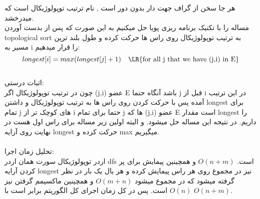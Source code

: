 \problem{}
هر جا سخن از گراف جهت دار بدون دور است , نام ترتیب توپولوژیکال است که میدرخشد.\\
مساله را با تکنیک برنامه ریزی پویا حل میکنیم به این صورت که 
پس از بدست آوردن topological sort 
به ترتیب توپولوژیکال روی راس ها حرکت کرده و طول بلند ترین مسیر به i را قرار میدهیم:\\
\[
    longest[i] = max(longest[j]+1)\quad \text{\LR{for all j that we have (j,i) in E}}
\]
\\
اثبات درستی:\\
 چون در ترتیب توپولوژیکال اگر  (j,i) عضو E
باشد آنگاه حتما j قبل از i در این ترتیب آمده
پس با حرکت کردن روی راس ها به ترتیب توپولوژیکال و داشتن longest  برای تمام j های 
کوچک تر از i حتما برای تمام j ها که (j,i) عضو E است
مقدار longest را داریم.
در نتیجه این مساله حل میشود.
و البته اولین زیر مساله برای راس اول هست 
در نهایت روی آرایه longest حرکت کرده و max میگیریم.\\\\
تحلیل زمان اجرا:\\
اردر توپولوژیکال سورت همان اردر dfs است. $O(n+m)$
 و همچینین پیمایش برای پر کردن آرایه longest نیز در مجموع روی هر راس پیمایش کرده
 و هر یال یک بار در نظر گرفته میشود که در مجموع میشود $O(m+n)$ 
 و همچینین ماکسیمم گرفتن نیز $O(n)$ است.
 پس در کل
 زمان اجرای کل الگوریتم برابر است با $O(n+m)$.